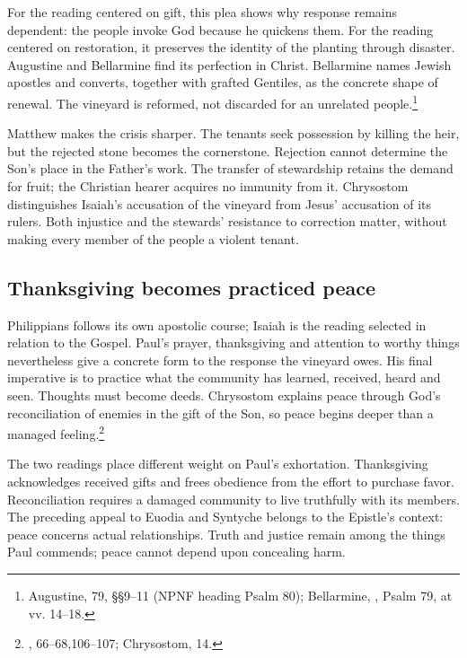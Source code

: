 For the reading centered on gift, this plea shows why response remains dependent: the people invoke God because he quickens them. For the reading centered on restoration, it preserves the identity of the planting through disaster. Augustine and Bellarmine find its perfection in Christ. Bellarmine names Jewish apostles and converts, together with grafted Gentiles, as the concrete shape of renewal. The vineyard is reformed, not discarded for an unrelated people.\footnote{Augustine,  79, §§9--11 (NPNF heading Psalm 80); Bellarmine, , Psalm 79, at vv. 14--18.}

Matthew makes the crisis sharper. The tenants seek possession by killing the heir, but the rejected stone becomes the cornerstone. Rejection cannot determine the Son's place in the Father's work. The transfer of stewardship retains the demand for fruit; the Christian hearer acquires no immunity from it. Chrysostom distinguishes Isaiah's accusation of the vineyard from Jesus' accusation of its rulers. Both injustice and the stewards' resistance to correction matter, without making every member of the people a violent tenant.

\clearpage
\subsection{Thanksgiving becomes practiced peace}
Philippians follows its own apostolic course; Isaiah is the reading selected in relation to the Gospel. Paul's prayer, thanksgiving and attention to worthy things nevertheless give a concrete form to the response the vineyard owes. His final imperative is to practice what the community has learned, received, heard and seen. Thoughts must become deeds. Chrysostom explains peace through God's reconciliation of enemies in the gift of the Son, so peace begins deeper than a managed feeling.\footnote{, 66--68,106--107; Chrysostom,  14.}

The two readings place different weight on Paul's exhortation. Thanksgiving acknowledges received gifts and frees obedience from the effort to purchase favor. Reconciliation requires a damaged community to live truthfully with its members. The preceding appeal to Euodia and Syntyche belongs to the Epistle's context: peace concerns actual relationships. Truth and justice remain among the things Paul commends; peace cannot depend upon concealing harm.

